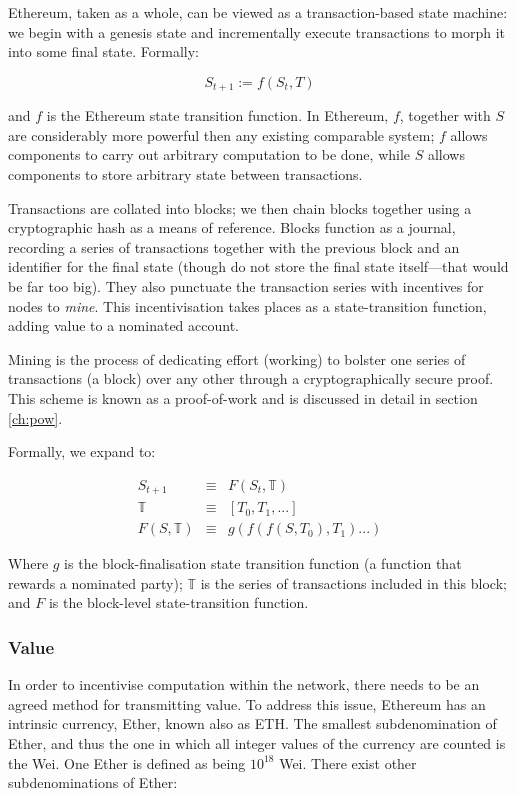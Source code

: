 \documentclass[9pt,oneside]{amsart}
\begin{document}
\begin{multicols}{2}
Ethereum, taken as a whole, can be viewed as a transaction-based state machine: we begin with a genesis state and incrementally execute transactions to morph it into some final state. Formally:

\begin{equation}
S_{t+1} := f(S_t, T)
\end{equation}

and $f$ is the Ethereum state transition function. In Ethereum, $f$, together with $S$ are considerably more powerful then any existing comparable system; $f$ allows components to carry out arbitrary computation to be done, while $S$ allows components to store arbitrary state between transactions.

Transactions are collated into blocks; we then chain blocks together using a cryptographic hash as a means of reference. Blocks function as a journal, recording a series of transactions together with the previous block and an identifier for the final state (though do not store the final state itself---that would be far too big). They also punctuate the transaction series with incentives for nodes to \textit{mine}. This incentivisation takes places as a state-transition function, adding value to a nominated account.

Mining is the process of dedicating effort (working) to bolster one series of transactions (a block) over any other through a cryptographically secure proof. This scheme is known as a proof-of-work and is discussed in detail in section \ref{ch:pow}.

Formally, we expand to:

\begin{eqnarray}
S_{t+1} & \equiv & F(S_t, \mathbb{T}) \\
\mathbb{T} & \equiv & [ T_0, T_1, ... ] \\
F(S, \mathbb{T}) & \equiv & g(f(f(S, T_0), T_1) ...)
\end{eqnarray}

Where $g$ is the block-finalisation state transition function (a function that rewards a nominated party); $\mathbb{T}$ is the series of transactions included in this block; and $F$ is the block-level state-transition function.

\subsubsection{Value}

In order to incentivise computation within the network, there needs to be an agreed method for transmitting value. To address this issue, Ethereum has an intrinsic currency, Ether, known also as ETH. The smallest subdenomination of Ether, and thus the one in which all integer values of the currency are counted is the Wei. One Ether is defined as being $10^{18}$ Wei. There exist other subdenominations of Ether:


\end{multicols}
\end{document}
